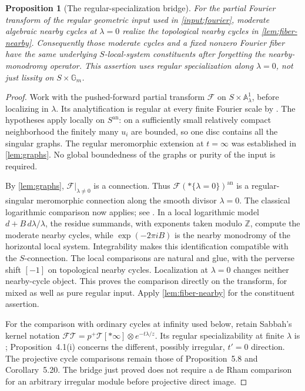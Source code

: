 \documentclass[11pt]{article}
\numberwithin{equation}{section}
\newtheorem{proposition}[proposition]{Proposition}
\theoremstyle{definition}
\theoremstyle{remark}
\newcommand{\A}{\mathbb A}
\newcommand{\Gm}{\mathbb G_m}
\newcommand{\Fcal}{\mathcal F}
\begin{document}
\begin{proposition}[The regular-specialization bridge]
\label{prop:regular-cycle-bridge}
For the partial Fourier transform of the regular geometric input used in
\cref{input:fourier}, moderate algebraic nearby cycles at $\lambda=0$
realize the topological nearby cycles in \cref{lem:fiber-nearby}.
Consequently those moderate cycles and a fixed nonzero Fourier fiber have
the same underlying $S$-local-system constituents after forgetting the
nearby-monodromy operator. This assertion uses regular specialization
along $\lambda=0$, not just lissity on $S\times\Gm$.
\end{proposition}
\begin{proof}
Work with the pushed-forward partial transform $\Fcal$ on
$S\times\A^1_\lambda$, before localizing in $\lambda$. Its analytification
is regular at every finite Fourier scale by
\cite[Theorem~1.11(1)]{DouaiSabbah}. The hypotheses apply locally on
$S^{\mathrm{an}}$: on a sufficiently small relatively compact
neighborhood the finitely many $u_i$ are bounded, so one disc contains
all the singular graphs. The regular meromorphic extension at $t=\infty$
was established in \cref{lem:graphs}. No global boundedness of the graphs
or purity of the input is required.

By \cref{lem:graphs}, $\Fcal|_{\lambda\ne0}$ is a connection. Thus
$\Fcal(*\{\lambda=0\})^{\mathrm{an}}$ is a regular-singular meromorphic
connection along the smooth divisor $\lambda=0$. The classical
logarithmic comparison now applies; see
\cite[II, Proposition~5.4, Remark~5.5(ii), and \S6]{DeligneRegular}.
In a local logarithmic model $d+B\,d\lambda/\lambda$, the residue
summands, with exponents taken modulo $\mathbb Z$, compute the moderate
nearby cycles, while $\exp(-2\pi iB)$ is the nearby monodromy of the
horizontal local system. Integrability makes this identification
compatible with the $S$-connection. The local comparisons are natural
and glue, with the perverse shift $[-1]$ on topological nearby cycles.
Localization at $\lambda=0$ changes neither nearby-cycle object.
This proves the comparison directly on the transform, for mixed as well
as pure regular input. Apply \cref{lem:fiber-nearby} for the constituent
assertion.

For the comparison with ordinary cycles at infinity used below, retain
Sabbah's kernel notation
$\mathcal F\mathcal T=p^+\mathcal T[*\infty]\otimes e^{-t\lambda/z}$.
Its regular specializability at finite $\lambda$ is
\cite[Proposition~4.1(ii)]{SabbahMonodromy}; Proposition~4.1(i) concerns
the different, possibly irregular, $t'=0$ direction. The projective
cycle comparisons remain those of Proposition~5.8 and Corollary~5.20.
The bridge just proved does not require a de Rham comparison for an
arbitrary irregular module before projective direct image.
\end{proof}
\end{document}
